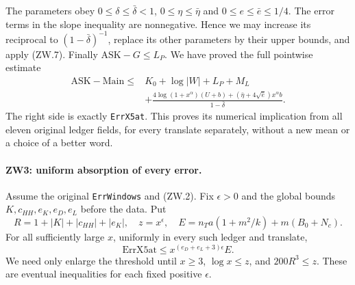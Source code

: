 The parameters obey $0\le\delta\le\bar\delta<1$,
$0\le\eta\le\bar\eta$ and $0\le e\le\bar e\le1/4$.
The error terms in the slope inequality are nonnegative.  Hence we may
increase its reciprocal to $(1-\bar\delta)^{-1}$, replace its other
parameters by their upper bounds, and apply (ZW.7).
Finally $\mathrm{ASK}-G\le L_P$.  We have proved the full pointwise
estimate
\[
\begin{split}
 \mathrm{ASK}-\mathrm{Main}\le{}&K_0+\log|W|+L_P+M_L\\
 &+\frac{4\log(1+x^\alpha)(U+b)
       +(\bar\eta+4\sqrt{\bar e})x^\alpha b}
                  {1-\bar\delta}.
\end{split}                                                       \tag{ZW.8}
\]
The right side is exactly \texttt{ErrX5at}.  This proves its numerical
implication from all eleven original ledger fields, for every translate
separately, without a new mean or a choice of a better word.

\paragraph{ZW3: uniform absorption of every error.}
\label{claim:ZW3}
Assume the original \texttt{ErrWindows} and (ZW.2).
Fix $\epsilon>0$ and the global bounds $K,c_{HH},e_K,e_D,e_L$ before
the data.  Put
\[
 R=1+|K|+|c_{HH}|+|e_K|,\quad z=x^\epsilon,\quad
 E=n_Ta(1+m^2/k)+m(B_0+N_c).
\]
For all sufficiently large $x$, uniformly in every such ledger and
translate,
\[
                 \mathrm{ErrX5at}\le
                     x^{(e_D+e_L+3)\epsilon}E.                   \tag{ZW.9}
\]
We need only enlarge the threshold until
$x\ge3$, $\log x\le z$, and $200R^3\le z$.
These are eventual inequalities for each fixed positive $\epsilon$.

